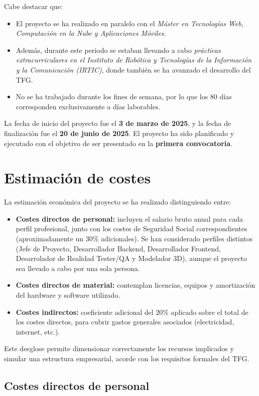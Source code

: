 Cabe destacar que:
\begin{itemize}
    \item El proyecto se ha realizado en paralelo con el \textit{Máster en Tecnologías Web, Computación en la Nube y Aplicaciones Móviles}.
    \item Además, durante este periodo se estaban llevando a cabo \textit{prácticas extracurriculares en el Instituto de Robótica y Tecnologías de la Información y la Comunicación (IRTIC)}, donde también se ha avanzado el desarrollo del TFG.
    \item No se ha trabajado durante los fines de semana, por lo que los 80 días corresponden exclusivamente a días laborables.
\end{itemize}

La fecha de inicio del proyecto fue el \textbf{3 de marzo de 2025}, y la fecha de finalización fue el \textbf{20 de junio de 2025}. El proyecto ha sido planificado y ejecutado con el objetivo de ser presentado en la \textbf{primera convocatoria}.
\section{Estimación de costes}

La estimación económica del proyecto se ha realizado distinguiendo entre:
\begin{itemize}
  \item \textbf{Costes directos de personal:} incluyen el salario bruto anual para cada perfil profesional, junto con los costes de Seguridad Social correspondientes (aproximadamente un 30\% adicionales). Se han considerado perfiles distintos (Jefe de Proyecto, Desarrollador Backend, Desarrollador Frontend, Desarrolador de Realidad Tester/QA y Modelador 3D), aunque el proyecto sea llevado a cabo por una sola persona.
  \item \textbf{Costes directos de material:} contemplan licencias, equipos y amortización del hardware y software utilizado.
  \item \textbf{Costes indirectos:} coeficiente adicional del 20\% aplicado sobre el total de los costes directos, para cubrir gastos generales asociados (electricidad, internet, etc.).
\end{itemize}


Este desglose permite dimensionar correctamente los recursos implicados y simular una estructura empresarial, acorde con los requisitos formales del TFG.

\subsection{Costes directos de personal}

